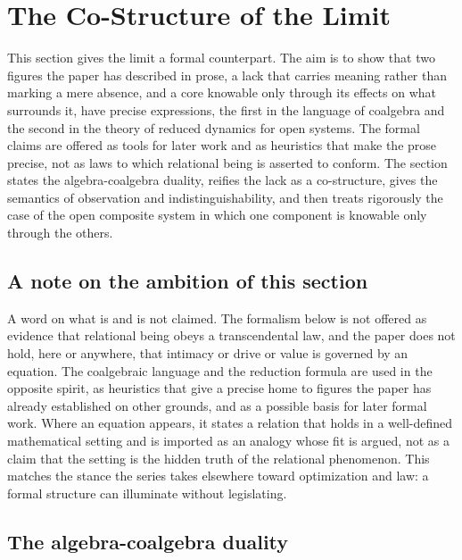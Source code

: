 \section{The Co-Structure of the Limit}
\label{p26:sec:costructure}

\noindent
This section gives the limit a formal counterpart. The aim is to show that two figures the paper has described in prose, a lack that carries meaning rather than marking a mere absence, and a core knowable only through its effects on what surrounds it, have precise expressions, the first in the language of coalgebra and the second in the theory of reduced dynamics for open systems. The formal claims are offered as tools for later work and as heuristics that make the prose precise, not as laws to which relational being is asserted to conform. The section states the algebra-coalgebra duality, reifies the lack as a co-structure, gives the semantics of observation and indistinguishability, and then treats rigorously the case of the open composite system in which one component is knowable only through the others.

\subsection*{A note on the ambition of this section}

A word on what is and is not claimed. The formalism below is not offered as evidence that relational being obeys a transcendental law, and the paper does not hold, here or anywhere, that intimacy or drive or value is governed by an equation. The coalgebraic language and the reduction formula are used in the opposite spirit, as heuristics that give a precise home to figures the paper has already established on other grounds, and as a possible basis for later formal work. Where an equation appears, it states a relation that holds in a well-defined mathematical setting and is imported as an analogy whose fit is argued, not as a claim that the setting is the hidden truth of the relational phenomenon. This matches the stance the series takes elsewhere toward optimization and law: a formal structure can illuminate without legislating.

\subsection*{The algebra-coalgebra duality}

